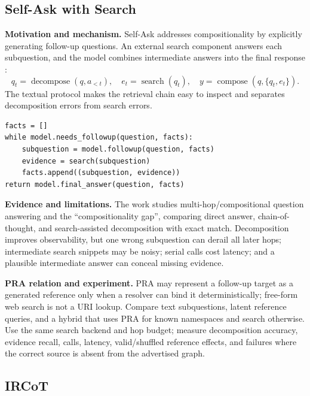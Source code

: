 \subsection{Self-Ask with Search}

\textbf{Motivation and mechanism.} Self-Ask addresses compositionality by explicitly
generating follow-up questions.  An external search component answers each subquestion, and
the model combines intermediate answers into the final response
\citep{press2022selfask}:
\begin{equation}
q_t=\operatorname{decompose}(q,a_{<t}),\quad
e_t=\operatorname{search}(q_t),\quad
y=\operatorname{compose}(q,\{q_t,e_t\}).
\end{equation}
The textual protocol makes the retrieval chain easy to inspect and separates decomposition
errors from search errors.

\begin{lstlisting}[caption={Self-Ask protocol}]
facts = []
while model.needs_followup(question, facts):
    subquestion = model.followup(question, facts)
    evidence = search(subquestion)
    facts.append((subquestion, evidence))
return model.final_answer(question, facts)
\end{lstlisting}

\textbf{Evidence and limitations.} The work studies multi-hop/compositional question
answering and the ``compositionality gap'', comparing direct answer, chain-of-thought, and
search-assisted decomposition with exact match.  Decomposition improves observability, but
one wrong subquestion can derail all later hops; intermediate search snippets may be noisy;
serial calls cost latency; and a plausible intermediate answer can conceal missing evidence.

\textbf{PRA relation and experiment.} PRA may represent a follow-up target as a generated
reference only when a resolver can bind it deterministically; free-form web search is not a
URI lookup.  Compare text subquestions, latent reference queries, and a hybrid that uses
PRA for known namespaces and search otherwise.  Use the same search backend and hop budget;
measure decomposition accuracy, evidence recall, calls, latency, valid/shuffled reference
effects, and failures where the correct source is absent from the advertised graph.

\subsection{IRCoT}


